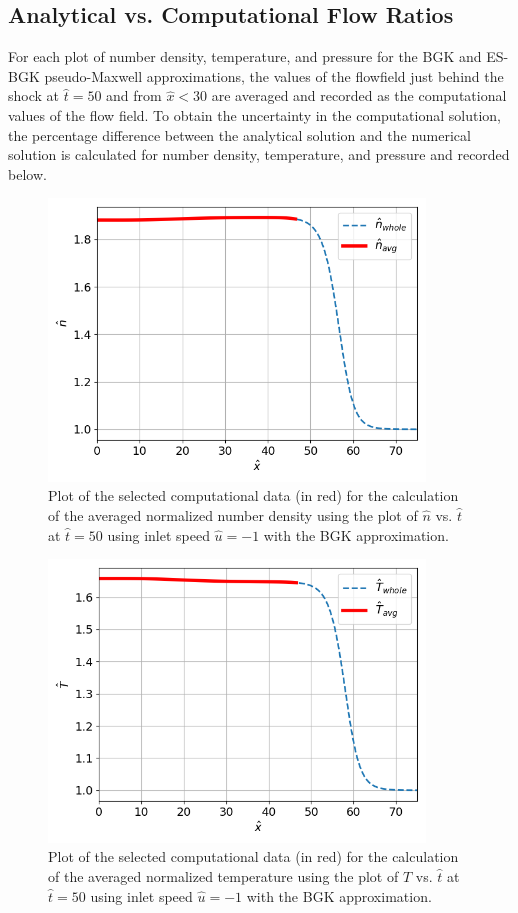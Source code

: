 \documentclass[a4paper]{article}
\begin{document}
\subsection{Analytical vs. Computational Flow Ratios}
For each plot of number density, temperature, and pressure for the BGK and ES-BGK pseudo-Maxwell approximations, the values of the flowfield just behind the shock at $\hat{t} = 50$ and from $\hat{x} < 30$ are averaged and recorded as the computational values of the flow field. To obtain the uncertainty in the computational solution, the percentage difference between the analytical solution and the numerical solution is calculated for number density, temperature, and pressure and recorded below.  
\begin{figure}[hbt!]
    \centering
    \includegraphics[width=10cm]{plots/problem_h_BGK_n.png}
    \caption{\centering Plot of the selected computational data (in red) for the calculation of the averaged normalized number density using the plot of $\hat{n}$ vs. $\hat{t}$ at $\hat{t} = 50$ using inlet speed $\hat{u} = -1$ with the BGK approximation.}
    \label{problem_h_BGK_n}
\end{figure}
\begin{figure}[hbt!]
    \centering
    \includegraphics[width=10cm]{plots/problem_h_BGK_T.png}
    \caption{\centering Plot of the selected computational data (in red) for the calculation of the averaged normalized temperature using the plot of $\hat{T}$ vs. $\hat{t}$ at $\hat{t} = 50$ using inlet speed $\hat{u} = -1$ with the BGK approximation.}
    \label{problem_h_BGK_T}
\end{figure}
\end{document}
